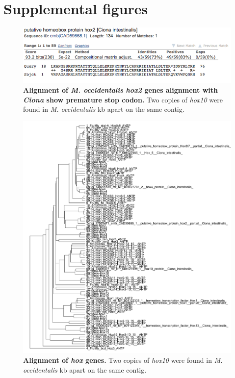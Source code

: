 \chapter{Supplemental figures}
\begin{figure}[thbp]
\centering
\includegraphics[scale=0.75]{figures/occi_hox2.png}
\caption{\textbf{Alignment of \textit{M. occidentalis} \textit{hox2} genes alignment with \textit{Ciona} show  premature stop codon.} Two copies of \textit{hox10} were found in \textit{M. occidentalis}  kb apart on the same contig.}
\label{fig:occihox2}
\end{figure}

\begin{figure}[tbp]
\centering
\includegraphics[scale=0.85]{figures/hox_alignment.pdf}
\caption{\textbf{Alignment of \textit{hox} genes.} Two copies of \textit{hox10} were found in \textit{M. occidentalis}  kb apart on the same contig.}
\label{fig:hox-alignments}
\end{figure}

